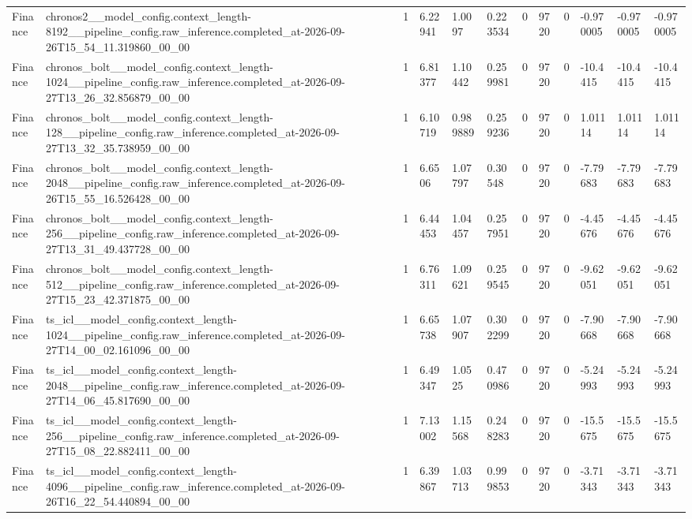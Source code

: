 \begin{tabular}{llllllllllll}
Finance & chronos2\_\_model\_config.context\_length-8192\_\_pipeline\_config.raw\_inference.completed\_at-2026-09-26T15\_54\_11.319860\_00\_00 & 1 & 6.22941 & 1.0097 & 0.223534 & 0 & 9720 & 0 & -0.970005 & -0.970005 & -0.970005 \\
Finance & chronos\_bolt\_\_model\_config.context\_length-1024\_\_pipeline\_config.raw\_inference.completed\_at-2026-09-27T13\_26\_32.856879\_00\_00 & 1 & 6.81377 & 1.10442 & 0.259981 & 0 & 9720 & 0 & -10.4415 & -10.4415 & -10.4415 \\
Finance & chronos\_bolt\_\_model\_config.context\_length-128\_\_pipeline\_config.raw\_inference.completed\_at-2026-09-27T13\_32\_35.738959\_00\_00 & 1 & 6.10719 & 0.989889 & 0.259236 & 0 & 9720 & 0 & 1.01114 & 1.01114 & 1.01114 \\
Finance & chronos\_bolt\_\_model\_config.context\_length-2048\_\_pipeline\_config.raw\_inference.completed\_at-2026-09-26T15\_55\_16.526428\_00\_00 & 1 & 6.6506 & 1.07797 & 0.30548 & 0 & 9720 & 0 & -7.79683 & -7.79683 & -7.79683 \\
Finance & chronos\_bolt\_\_model\_config.context\_length-256\_\_pipeline\_config.raw\_inference.completed\_at-2026-09-27T13\_31\_49.437728\_00\_00 & 1 & 6.44453 & 1.04457 & 0.257951 & 0 & 9720 & 0 & -4.45676 & -4.45676 & -4.45676 \\
Finance & chronos\_bolt\_\_model\_config.context\_length-512\_\_pipeline\_config.raw\_inference.completed\_at-2026-09-27T15\_23\_42.371875\_00\_00 & 1 & 6.76311 & 1.09621 & 0.259545 & 0 & 9720 & 0 & -9.62051 & -9.62051 & -9.62051 \\
Finance & ts\_icl\_\_model\_config.context\_length-1024\_\_pipeline\_config.raw\_inference.completed\_at-2026-09-27T14\_00\_02.161096\_00\_00 & 1 & 6.65738 & 1.07907 & 0.302299 & 0 & 9720 & 0 & -7.90668 & -7.90668 & -7.90668 \\
Finance & ts\_icl\_\_model\_config.context\_length-2048\_\_pipeline\_config.raw\_inference.completed\_at-2026-09-27T14\_06\_45.817690\_00\_00 & 1 & 6.49347 & 1.0525 & 0.470986 & 0 & 9720 & 0 & -5.24993 & -5.24993 & -5.24993 \\
Finance & ts\_icl\_\_model\_config.context\_length-256\_\_pipeline\_config.raw\_inference.completed\_at-2026-09-27T15\_08\_22.882411\_00\_00 & 1 & 7.13002 & 1.15568 & 0.248283 & 0 & 9720 & 0 & -15.5675 & -15.5675 & -15.5675 \\
Finance & ts\_icl\_\_model\_config.context\_length-4096\_\_pipeline\_config.raw\_inference.completed\_at-2026-09-26T16\_22\_54.440894\_00\_00 & 1 & 6.39867 & 1.03713 & 0.999853 & 0 & 9720 & 0 & -3.71343 & -3.71343 & -3.71343 \\

\end{tabular}
